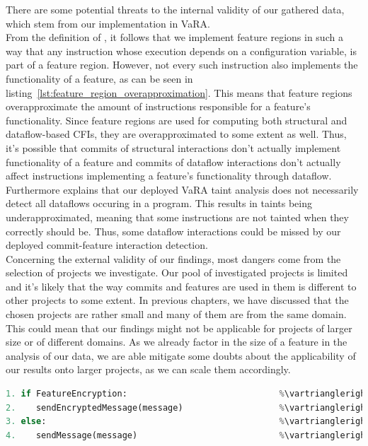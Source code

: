 There are some potential threats to the internal validity of our gathered data, which stem from our implementation in VaRA. \\
From the definition of , it follows that we implement feature regions in such a way that any instruction whose execution depends on a configuration variable, is part of a feature region.
However, not every such instruction also implements the functionality of a feature, as can be seen in listing~\ref{lst:feature_region_overapproximation}.
This means that feature regions overapproximate the amount of instructions responsible for a feature's functionality.
Since feature regions are used for computing both structural and dataflow-based CFIs, they are overapproximated to some extent as well.
Thus, it's possible that commits of structural interactions don't actually implement functionality of a feature and commits of dataflow interactions don't actually affect instructions implementing a feature's functionality through dataflow.
Furthermore \citet{sattler2023seal} explains that our deployed VaRA taint analysis does not necessarily detect all dataflows occuring in a program.
This results in taints being underapproximated, meaning that some instructions are not tainted when they correctly should be.
Thus, some dataflow interactions could be missed by our deployed commit-feature interaction detection. \\
Concerning the external validity of our findings, most dangers come from the selection of projects we investigate.
Our pool of investigated projects is limited and it's likely that the way commits and features are used in them is different to other projects to some extent.
In previous chapters, we have discussed that the chosen projects are rather small and many of them are from the same domain.
This could mean that our findings might not be applicable for projects of larger size or of different domains.
As we already factor in the size of a feature in the analysis of our data, we are able mitigate some doubts about the applicability of our results onto larger projects, as we can scale them accordingly. \\

\begin{lstlisting}[language=python, caption={Feature Region Overapproximation. The function of \texttt{FeatureEncryption} is to send the message encrypted. According to our definition of feature regions all instructions stemming from the shown lines of code belong to a region of \texttt{FeatureEncryption}, as their execution depends on the configuration variable of \texttt{FeatureEncryption}. However only instructions stemming from the lines 1-2 implement the actual functionality of the feature. Thus our analysis overapproximates the lines 3-4 to also belong to the feature.}, label={lst:feature_region_overapproximation}]
1. if FeatureEncryption:                              %\vartriangleright% %FeatureEncryption%
2.    sendEncryptedMessage(message)                   %\vartriangleright% %FeatureEncryption%
3. else:                                              %\vartriangleright% %FeatureEncryption%
4.    sendMessage(message)                            %\vartriangleright% %FeatureEncryption%
\end{lstlisting}
